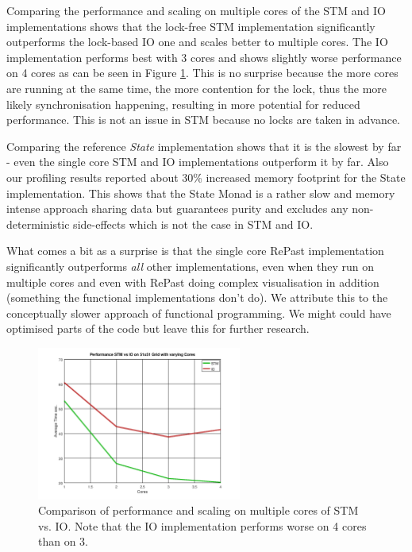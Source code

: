 Comparing the performance and scaling on multiple cores of the STM and IO implementations shows that the lock-free STM implementation significantly outperforms the lock-based IO one and scales better to multiple cores. The IO implementation performs best with 3 cores and shows slightly worse performance on 4 cores as can be seen in Figure \ref{fig:core_duration_stm_io}. This is no surprise because the more cores are running at the same time, the more contention for the lock, thus the more likely synchronisation happening, resulting in more potential for reduced performance. This is not an issue in STM because no locks are taken in advance. 

Comparing the reference \textit{State} implementation shows that it is the slowest by far - even the single core STM and IO implementations outperform it by far. Also our profiling results reported about 30\% increased memory footprint for the State implementation. This shows that the State Monad is a rather slow and memory intense approach sharing data but guarantees purity and excludes any non-deterministic side-effects which is not the case in STM and IO.

What comes a bit as a surprise is that the single core RePast implementation significantly outperforms \textit{all} other implementations, even when they run on multiple cores and even with RePast doing complex visualisation in addition (something the functional implementations don't do). We attribute this to the conceptually slower approach of functional programming. We might could have optimised parts of the code but leave this for further research.

\begin{figure}
	\centering
	\includegraphics[width=0.6\textwidth, angle=0]{./fig/sir/core_duration_stm_io.png}
	\caption{Comparison of performance and scaling on multiple cores of STM vs. IO. Note that the IO implementation performs worse on 4 cores than on 3.}
	\label{fig:core_duration_stm_io}
\end{figure}

